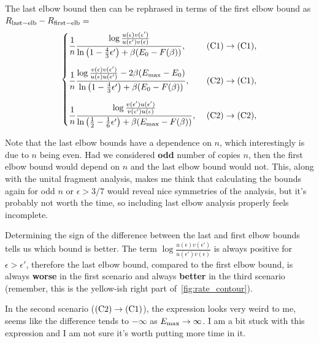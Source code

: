 \documentclass[pra,
aps,
twocolumn,
superscriptaddress,
groupedaddress,
nofootinbib,
reprint
]{revtex4-1}
\begin{document}
The last elbow bound then can be rephrased in terms of the first elbow bound as $R_{\rm{last-elb}} - R_{\rm{first-elb}} = $
\begin{equation}\label{eq:last_elb_coords}
	\begin{cases}
		\dfrac{1}{n} \dfrac{\log{\frac{u(\epsilon)v(\epsilon')}{u(\epsilon')v(\epsilon)}}}{\ln{\big( 1-\frac{4}{3}\epsilon' \big)} + \beta (E_0 - F(\beta))},\ &\rm{(C1)} \rightarrow \rm{(C1)}, \vspace{10pt}\\
		\dfrac{1}{n} \dfrac{\log{\frac{v(\epsilon)v(\epsilon')}{u(\epsilon)u(\epsilon')}} - 2\beta(E_{\rm{max}} - E_0)}{\ln{\big( 1-\frac{4}{3}\epsilon' \big)} + \beta (E_0 - F(\beta))},\ &\rm{(C2)} \rightarrow \rm{(C1)}, \vspace{10pt}\\
		\dfrac{1}{n} \dfrac{\log{\frac{v(\epsilon')u(\epsilon')}{v(\epsilon')u(\epsilon)}}}{\ln{\big( \frac{1}{2}-\frac{1}{6}\epsilon' \big)} + \beta (E_{\rm{max}} - F(\beta))},\ &\rm{(C2)} \rightarrow \rm{(C2)}, 
	\end{cases}
\end{equation}

Note that the last elbow bounds have a dependence on $n$, which interestingly is due to $n$ being even.
Had we considered \textbf{odd} number of copies $n$, then the first elbow bound would depend on $n$ and the last elbow bound would not.
This, along with the unital fragment analysis, makes me think that calculating the bounds again for odd $n$ or $\epsilon > 3/7$ would reveal nice symmetries of the analysis, but it's probably not worth the time, so including last elbow analysis properly feels incomplete.

Determining the sign of the difference between the last and first elbow bounds tells us which bound is better.
The term $\log{\frac{u(\epsilon)v(\epsilon')}{u(\epsilon')v(\epsilon)}}$ is always positive for $\epsilon > \epsilon'$, therefore the last elbow bound, compared to the first elbow bound, is always \textbf{worse} in the first scenario and always \textbf{better} in the third scenario (remember, this is the yellow-ish right part of~\cref{fig:rate_contour}).

In the second scenario ($\rm{(C2)} \rightarrow \rm{(C1)}$), the expression looks very weird to me, seems like the difference tends to $-\infty$ as $E_{\rm{max}} \rightarrow \infty$.
I am a bit stuck with this expression and I am not sure it's worth putting more time in it.

\end{document}

